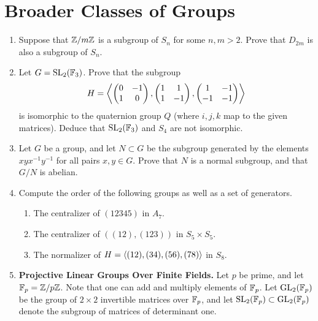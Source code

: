 \documentclass[../psets.tex]{subfiles}
\begin{document}
\section{Broader Classes of Groups}
\begin{enumerate}
    \item {}Suppose that $\mathbb{Z}/m\mathbb{Z}$ is a subgroup of $S_n$ for some $n,m>2$. Prove that $D_{2m}$ is also a subgroup of $S_n$.
    \item Let $G=\text{SL}_2(\mathbb{F}_3)$. Prove that the subgroup
    \begin{equation*}
        H = \left\langle{
            \begin{pmatrix}
                0 & -1\\
                1 & 0\\
            \end{pmatrix},
            \begin{pmatrix}
                1 & 1\\
                1 & -1\\
            \end{pmatrix},
            \begin{pmatrix}
                1 & -1\\
                -1 & -1\\
            \end{pmatrix}
        }\right\rangle
    \end{equation*}
    is isomorphic to the quaternion group $Q$ (where $i,j,k$ map to the given matrices). Deduce that $\text{SL}_2(\mathbb{F}_3)$ and $S_4$ are not isomorphic.
    \item Let $G$ be a group, and let $N\subset G$ be the subgroup generated by the elements $xyx^{-1}y^{-1}$ for all pairs $x,y\in G$. Prove that $N$ is a normal subgroup, and that $G/N$ is abelian.
    \item Compute the order of the following groups as well as a set of generators.
    \begin{enumerate}
        \item The centralizer of $(12345)$ in $A_7$.
        \item The centralizer of $((12),(123))$ in $S_5\times S_5$.
        \item The normalizer of $H=\left\langle{(12),(34),(56),(78)}\right\rangle$ in $S_8$.
    \end{enumerate}
    \item \textbf{Projective Linear Groups Over Finite Fields.} Let $p$ be prime, and let $\mathbb{F}_p=\mathbb{Z}/p\mathbb{Z}$. Note that one can add and multiply elements of $\mathbb{F}_p$. Let $\text{GL}_2(\mathbb{F}_p)$ be the group of $2\times 2$ invertible matrices over $\mathbb{F}_p$, and let $\text{SL}_2(\mathbb{F}_p)\subset\text{GL}_2(\mathbb{F}_p)$ denote the subgroup of matrices of determinant one.

\end{enumerate}
\end{document}

